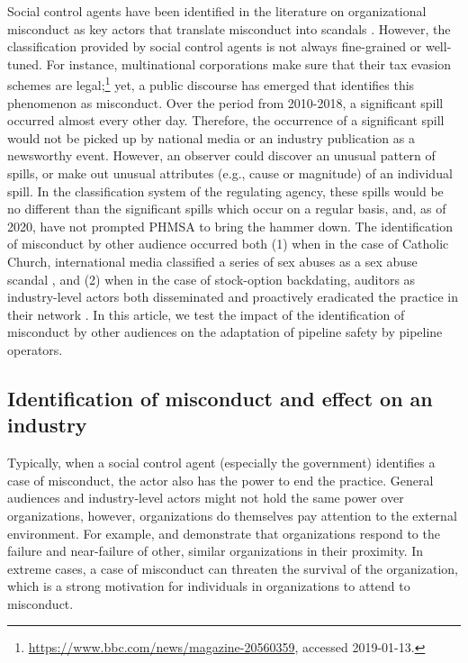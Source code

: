 Social control agents have been identified in the literature on organizational misconduct as key actors that translate misconduct into scandals \citep{Greve2010}. However, the classification provided by social control agents is not always fine-grained or well-tuned. For instance, multinational corporations make sure that their tax evasion schemes are legal;\footnote{\url{https://www.bbc.com/news/magazine-20560359}, accessed 2019-01-13.} yet, a public discourse has emerged that identifies this phenomenon as misconduct. Over the period from 2010-2018, a significant spill occurred almost every other day. Therefore, the occurrence of a significant spill would not be picked up by national media or an industry publication as a newsworthy event. However, an observer could discover an unusual pattern of spills, or make out unusual attributes (e.g., cause or magnitude) of an individual spill. In the classification system of the regulating agency, these spills would be no different than the significant spills which occur on a regular basis, and, as of 2020, have not prompted PHMSA to bring the hammer down. The identification of misconduct by other audience occurred both (1) when in the case of Catholic Church, international media classified a series of sex abuses as a sex abuse scandal \citep{Piazza2018}, and (2) when in the case of stock-option backdating, auditors as industry-level actors both disseminated and proactively eradicated the practice in their network \citep{Mohliver2019}. In this article, we test the impact of the identification of misconduct by other audiences on the adaptation of pipeline safety by pipeline operators.
	
\subsection{Identification of misconduct and effect on an industry}

Typically, when a social control agent (especially the government) identifies a case of misconduct, the actor also has the power to end the practice. General audiences and industry-level actors might not hold the same power over organizations, however, organizations do themselves pay attention to the external environment. For example, \citet{Kim2007} and \citet{Madsen2010} demonstrate that organizations respond to the failure and near-failure of other, similar organizations in their proximity. In extreme cases, a case of misconduct can threaten the survival of the organization, which is a strong motivation for individuals in organizations to attend to misconduct.

